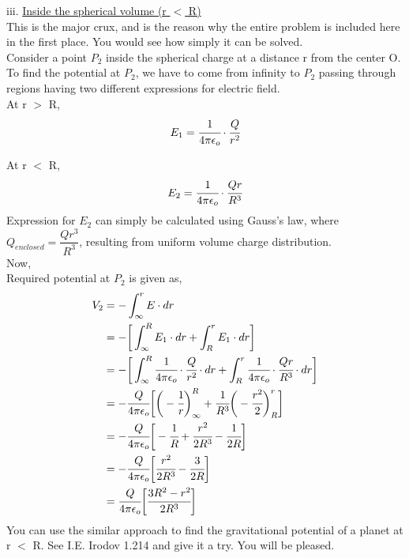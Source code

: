 iii. \underline{Inside the spherical volume (r $<$ R)}
\vspace{5pt}
\\ This is the major crux, and is the reason why the entire problem is included here in the first place. You would see how simply it can be solved.
\vspace{2pt}
\\
Consider a point $P_2$ inside the spherical charge at a distance r from the center O. To find the potential at $P_2$, we have to come from infinity to $P_2$
passing through regions having two different expressions for electric field.\\

 At r $>$ R,
\[  E_1 = \cfrac{1}{4 \pi \epsilon_o}\cdot \cfrac{Q}{r^2}\]

At r $<$ R,
\[ E_2 = \cfrac{1}{4 \pi \epsilon_o}\cdot \cfrac{Qr}{R^3}\]
Expression for $E_2$ can simply be calculated using Gauss's law, where $Q_{enclosed} = \dfrac{Qr^3}{R^3}$, resulting from uniform volume charge distribution.
\\
Now,
\\
Required potential at $P_2$ is given as,
\begin{equation*}
\begin{split}
V_2 &= -\int_\infty^r E \cdot dr\\
    &= - \bigg[\int_\infty^R E_1 \cdot dr  +  \int_R ^r E_1 \cdot dr\bigg]\\ 
    &= - \bigg[\int_\infty^R \cfrac{1}{4 \pi \epsilon_o}\cdot \cfrac{Q}{r^2} \cdot dr + \int_R ^r\cfrac{1}{4 \pi \epsilon_o}\cdot \cfrac{Qr}{R^3} \cdot dr \bigg]\\
    &= -\cfrac{Q}{4 \pi \epsilon_o} \bigg[ \bigg(-\cfrac{1}{r}\bigg)_\infty^R + \cfrac{1}{R^3}\bigg(-\cfrac{r^2}{2}\bigg)_R^r \bigg]\\
    &= -\cfrac{Q}{4 \pi \epsilon_o} \bigg[-\cfrac{1}{R} + \cfrac{r^2}{2R^3} - \cfrac{1}{2R} \bigg]\\
    &= -\cfrac{Q}{4 \pi \epsilon_o} \bigg[\cfrac{r^2}{2R^3} - \cfrac{3}{2R} \bigg]\\
    &= \cfrac{Q}{4 \pi \epsilon_o} \bigg[\cfrac{3R^2 - r^2}{2R^3}\bigg]\\
\end{split}
\end{equation*} 
You can use the similar approach to find the gravitational potential of a planet at r $<$ R. See I.E. Irodov 1.214 and give it a try. You will be pleased. \\

